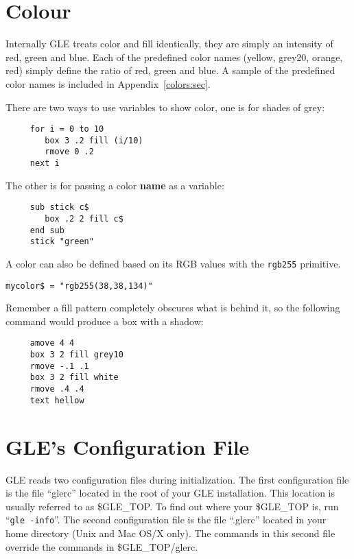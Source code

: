 
\section{Colour}

Internally GLE treats color and fill identically, they are simply an intensity of red, green and blue. Each of the predefined color names (yellow, grey20, orange, red) simply define the ratio of red, green and blue. A sample of the predefined color names is included in Appendix~\ref{colors:sec}.

There are two ways to use variables to show color, one is for shades of grey:
\begin{verbatim}
     for i = 0 to 10
        box 3 .2 fill (i/10)
        rmove 0 .2
     next i
\end{verbatim}
The other is for passing a color {\bf name} as a variable:
\begin{verbatim}
     sub stick c$
        box .2 2 fill c$
     end sub
     stick "green"	
\end{verbatim}

A color can also be defined based on its RGB values with the \texttt{rgb255} primitive.
\begin{verbatim}
mycolor$ = "rgb255(38,38,134)"
\end{verbatim}

Remember a fill pattern completely obscures what is behind it, 
so the following command would produce a box with a shadow:
\begin{verbatim}
     amove 4 4 
     box 3 2 fill grey10
     rmove -.1 .1
     box 3 2 fill white
     rmove .4 .4
     text hellow
\end{verbatim}

\section{GLE's Configuration File} \label{conffile:sec}

GLE reads two configuration files during initialization. The first configuration file is the file ``glerc'' located in the root of your GLE installation. This location is usually referred to as \$GLE\_TOP. To find out where your \$GLE\_TOP is, run ``\texttt{gle -info}''. The second configuration file is the file ``.glerc'' located in your home directory (Unix and Mac OS/X only). The commands in this second file override the commands in \$GLE\_TOP/glerc.

